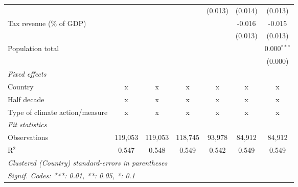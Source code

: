 \begin{tabular}{lcccccc}
                                                       &              &               &               & (0.013)        & (0.014)        & (0.013)\\   
   Tax revenue (\% of GDP)                             &              &               &               &                & -0.016         & -0.015\\   
                                                       &              &               &               &                & (0.013)        & (0.013)\\   
   Population total                                    &              &               &               &                &                & 0.000$^{***}$\\   
                                                       &              &               &               &                &                & (0.000)\\   
   \emph{Fixed effects}\\
   Country                                             & x            & x             & x             & x              & x              & x\\  
   Half decade                                         & x            & x             & x             & x              & x              & x\\  
   Type of climate action/measure                      & x            & x             & x             & x              & x              & x\\  
   \midrule \emph{Fit statistics}\\
   Observations                                        & 119,053      & 119,053       & 118,745       & 93,978         & 84,912         & 84,912\\  
   R$^2$                                               & 0.547        & 0.548         & 0.549         & 0.542          & 0.549          & 0.549\\  
   \midrule
   \multicolumn{7}{l}{\emph{Clustered (Country) standard-errors in parentheses}}\\
   \multicolumn{7}{l}{\emph{Signif. Codes: ***: 0.01, **: 0.05, *: 0.1}}\\
\end{tabular}
\par\endgroup


